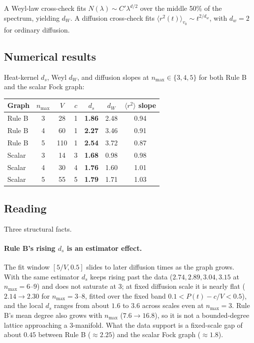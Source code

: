 \documentclass[11pt]{article}
\begin{document}
A Weyl-law cross-check fits $N(\lambda)\sim C'\lambda^{d/2}$ over the
middle 50\% of the spectrum, yielding $d_W$. A diffusion cross-check fits
$\langle r^2(t)\rangle_{v_0}\sim t^{2/d_w}$, with $d_w=2$ for ordinary
diffusion.

\subsection{Numerical results}

Heat-kernel $d_s$, Weyl $d_W$, and diffusion slopes at
$n_\text{max}\in\{3,4,5\}$ for both Rule B and the scalar Fock graph:

\begin{center}
\begin{tabular}{lcccccc}
\toprule
Graph & $n_\text{max}$ & $V$ & $c$ & $d_s$ & $d_W$ & $\langle r^2\rangle$ slope \\
\midrule
Rule B & 3 & 28  & 1 & \textbf{1.86} & 2.48 & 0.94 \\
Rule B & 4 & 60  & 1 & \textbf{2.27} & 3.46 & 0.91 \\
Rule B & 5 & 110 & 1 & \textbf{2.54} & 3.72 & 0.87 \\
\midrule
Scalar & 3 & 14 & 3 & \textbf{1.68} & 0.98 & 0.98 \\
Scalar & 4 & 30 & 4 & \textbf{1.76} & 1.60 & 1.01 \\
Scalar & 5 & 55 & 5 & \textbf{1.79} & 1.71 & 1.03 \\
\bottomrule
\end{tabular}
\end{center}

\subsection{Reading}

Three structural facts.

\paragraph{Rule B's rising $d_s$ is an estimator effect.} The fit window
$[5/V, 0.5]$ slides to later diffusion times as the graph grows.  With the
same estimator $d_s$ keeps rising past the data ($2.74, 2.89, 3.04, 3.15$
at $n_\text{max} = 6$--$9$) and does not saturate at 3; at fixed diffusion
scale it is nearly flat ($2.14 \to 2.30$ for $n_\text{max} = 3$--$8$, fitted
over the fixed band $0.1 < P(t) - c/V < 0.5$), and the local $d_s$ ranges from about $1.6$ to $3.6$ across
scales even at $n_\text{max} = 3$.  Rule B's mean degree also grows with
$n_\text{max}$ ($7.6 \to 16.8$), so it is not a bounded-degree lattice
approaching a 3-manifold.  What the data support is a fixed-scale gap of
about $0.45$ between Rule B ($\approx 2.25$) and the scalar Fock graph
($\approx 1.8$).
\end{document}
